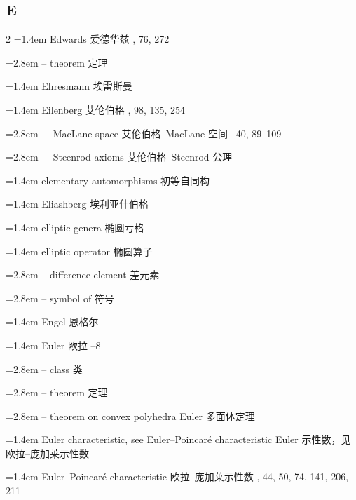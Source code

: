 \subsection*{E}
\small
\begin{multicols}{2}
\noindent\hangindent=1.4em Edwards \quad 爱德华兹 , 76, 272\par
\noindent\hangindent=2.8em -- theorem \quad 定理 \par
\noindent\hangindent=1.4em Ehresmann \quad 埃雷斯曼 \par
\noindent\hangindent=1.4em Eilenberg \quad 艾伦伯格 , 98, 135, 254\par
\noindent\hangindent=2.8em -- -MacLane space \quad 艾伦伯格--MacLane 空间 --40, 89--109\par
\noindent\hangindent=2.8em -- -Steenrod axioms \quad 艾伦伯格--Steenrod 公理 \par
\noindent\hangindent=1.4em elementary automorphisms \quad 初等自同构 \par
\noindent\hangindent=1.4em Eliashberg \quad 埃利亚什伯格 \par
\noindent\hangindent=1.4em elliptic genera \quad 椭圆亏格 \par
\noindent\hangindent=1.4em elliptic operator \quad 椭圆算子 \par
\noindent\hangindent=2.8em -- difference element \quad 差元素 \par
\noindent\hangindent=2.8em -- symbol of \quad 符号 \par
\noindent\hangindent=1.4em Engel \quad 恩格尔 \par
\noindent\hangindent=1.4em Euler \quad 欧拉 --8\par
\noindent\hangindent=2.8em -- class \quad 类 \par
\noindent\hangindent=2.8em -- theorem \quad 定理 \par
\noindent\hangindent=2.8em -- theorem on convex polyhedra \quad Euler 多面体定理 \par
\noindent\hangindent=1.4em Euler characteristic, see Euler--Poincar\'e characteristic \quad Euler 示性数，见欧拉--庞加莱示性数 \quad\par
\noindent\hangindent=1.4em Euler--Poincar\'e characteristic \quad 欧拉--庞加莱示性数 , 44, 50, 74, 141, 206, 211\par

\end{multicols}
